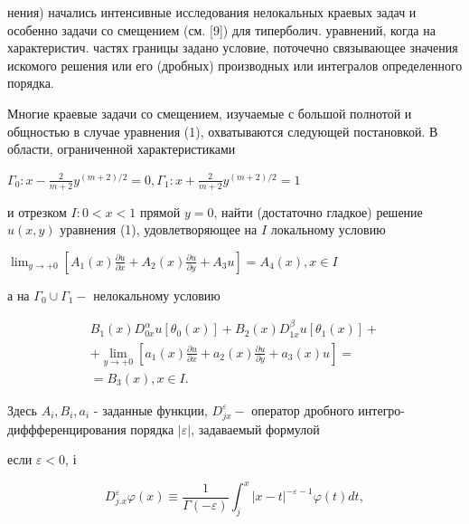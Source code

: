 \documentclass[10pt]{article}
\begin{document}
нения) начались интенсивные исследования нелокальных краевых задач и особенно задачи со смещением (см. [9]) для типерболич. уравнений, когда на характеристич. частях границы задано условие, поточечно связывающее значения искомого решения или его (дробных) производных или интегралов определенного порядка.



Многие краевые задачи со смещением, изучаемые с большой полнотой и общностью в случае уравнения (1), охватываются следующей постановкой. В области, ограниченной характеристиками



$\Gamma_{0}: x-\frac{2}{m+2} y^{(m+2) / 2}=0, \Gamma_{1}: x+\frac{2}{m+2} y^{(m+2) / 2}=1$



и отрезком $I: 0<x<1$ прямой $y=0$, найти (достаточно гладкое) решение $u(x, y)$ уравнения (1), удовлетворяющее на $I$ локальному условию



$\lim _{y \rightarrow+0}\left[A_{1}(x) \frac{\partial u}{\partial x}+A_{2}(x) \frac{\partial u}{\partial y}+A_{3} u\right]=A_{4}(x), x \in I$



а на $\Gamma_{0} \cup \Gamma_{1}-$ нелокальному условию



\[

\begin{gathered}

B_{1}(x) D_{0 x}^{\alpha} u\left[\theta_{0}(x)\right]+B_{2}(x) D_{1 x}^{\beta} u\left[\theta_{1}(x)\right]+ \\

+\lim _{y \rightarrow+0}\left[a_{1}(x) \frac{\partial u}{\partial x}+a_{2}(x) \frac{\partial u}{\partial y}+a_{3}(x) u\right]= \\

=B_{3}(x), x \in I .

\end{gathered}

\]



Здесь $A_{i}, B_{i}, a_{i}$ - заданные функции, $D_{j x}^{\varepsilon}-$ оператор дробного интегро-диффференцирования порядка $|\varepsilon|$, задаваемый формулой



если $\varepsilon<0$, і



\[

D_{j . x}^{\varepsilon} \varphi(x) \equiv \frac{1}{\Gamma(-\varepsilon)} \int_{j}^{x}|x-t|^{-\varepsilon-1} \varphi(t) d t,

\]
\end{document}
